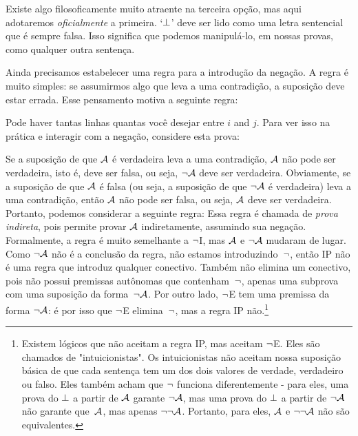 Existe algo filosoficamente  muito atraente na terceira op\c c\~ao, mas aqui adotaremos \emph{oficialmente} a primeira. `$\bot$'  deve ser lido como uma letra sentencial que \'e sempre falsa. Isso significa que podemos manipul\'a-lo, em nossas provas, como qualquer outra senten\c ca.

Ainda precisamos estabelecer uma regra para a introdu\c c\~ao da nega\c c\~ao. A regra \'e muito simples: se assumirmos algo que leva a uma contradi\c c\~ao, a suposi\c c\~ao deve estar errada. Esse pensamento motiva a seguinte regra:

Pode haver tantas linhas quantas voc\^e desejar entre $i$ and $j$. Para ver isso na pr\'atica e interagir com a nega\c c\~ao, considere esta prova: 
	\begin{fitchproof}
		\open
		\close
	\end{fitchproof}

Se a suposi\c c\~ao de que $\mathcal{A}$ \'e verdadeira leva a uma contradi\c c\~ao, $\mathcal{A}$ n\~ao pode ser verdadeira, isto \'e, deve ser falsa, ou seja, $\neg\mathcal{A}$ deve ser verdadeira. Obviamente, se a suposi\c c\~ao de que $\mathcal{A}$ \'e falsa (ou seja, a suposi\c c\~ao de que $\neg\mathcal{A}$ \'e verdadeira)  leva a uma contradi\c c\~ao, ent\~ao $\mathcal{A}$ n\~ao pode ser falsa, ou seja, $\mathcal{A}$ deve ser verdadeira. Portanto, podemos considerar a seguinte regra:
Essa regra \'e chamada de \emph{prova indireta}, pois permite provar $\mathcal{A}$  indiretamente, assumindo sua nega\c c\~ao. Formalmente, a regra \'e muito semelhante a $\neg$I, mas $\mathcal{A}$ e $\neg\mathcal{A}$ mudaram de lugar. Como $\neg\mathcal{A}$ n\~ao \'e a conclus\~ao da regra, n\~ao estamos introduzindo~$\neg$, ent\~ao  IP n\~ao \'e uma regra que introduz qualquer conectivo. Tamb\'em n\~ao elimina um conectivo, pois n\~ao possui premissas aut\^onomas que contenham~$\neg$, apenas uma subprova com uma suposi\c c\~ao da forma~$\neg\mathcal{A}$. Por outro lado, $\neg$E tem uma premissa da forma $\neg\mathcal{A}$: \'e por isso que $\neg$E elimina~$\neg$, mas a regra IP n\~ao.\footnote{Existem l\'ogicos que n\~ao aceitam a regra IP, mas aceitam $\neg$E. Eles s\~ao chamados de "intuicionistas". Os intuicionistas n\~ao aceitam nossa suposi\c c\~ao b\'asica de que cada senten\c ca tem um dos dois valores de verdade, verdadeiro ou falso. Eles tamb\'em acham que $\neg$ funciona diferentemente - para eles, uma prova do $\bot$ a partir de $\mathcal{A}$ garante $\neg \mathcal{A}$, mas uma prova do $\bot$ a partir de $\neg\mathcal{A}$ n\~ao garante que~$\mathcal{A}$, mas apenas $\neg\neg\mathcal{A}$. Portanto, para eles, $\mathcal{A}$ e $\neg\neg\mathcal{A}$ n\~ao s\~ao equivalentes.}


